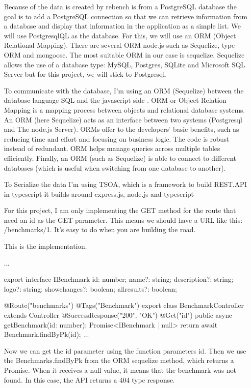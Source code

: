 \documentclass{article}
\begin{document}
Because of the data is created by rebench is from a PostgreSQL database the goal is to add a PostgreSQL connection so that we can retrieve information from a database and display that information in the application as a simple list.
We will use PostgresqlQL as the database. For this, we will use an ORM (Object Relational Mapping). There are several ORM node.js such as Sequelize, type ORM and mongoose. The most suitable ORM in our case is sequelize. Sequelize allows the use of a database type: MySQL, Postgres, SQLite and Microsoft SQL Server but for this project, we will stick to Postgresql.

To communicate with the database, I'm using an ORM (Sequelize) between the database language SQL and the javascript side \citep{pereira2016working}. ORM or Object Relation Mapping is a mapping process between objects and relational database systems. An ORM (here Sequelize) acts as an interface between two systems (Postgresql and The node.js Server). ORMs offer to the developers' basic benefits, such as reducing time and effort and focusing on business logic. The code is robust instead of redundant. ORM helps manage queries across multiple tables efficiently. Finally, an ORM (such as Sequelize) is able to connect to different databases (which is useful when switching from one database to another).



To Serialize the data I'm using TSOA, which is a framework to build REST.API in typescript it builds around express.js, node.js and typescript

For this project, I am only implementing the GET method for the route that need an id as the GET parameter. This means we should have a URL like this: /benchmarks/1. It's easy to do when you are building the road.

This is the implementation.

\begin{python}
...

export interface IBenchmark {
  id: number;
  name?: string;
  description?: string;
  logo?: string;
  showchanges?: boolean;
  allresults?: boolean;
}

@Route("benchmarks")
@Tags("Benchmark")
export class BenchmarkController extends Controller {
  @SuccessResponse("200", "OK")
  @Get("{id}")
  public async getBenchmark(id: number): Promise<IBenchmark | null> {
    return await Benchmark.findByPk(id);
  }
  ...
}
\end{python}

Now we can get the id parameter using the function parameters id. Then we use the Benchmarks.findByPk from the ORM sequelize method, which returns a Promise. When it receives a null value, it means that the benchmark was not found. In this case, the API returns a 404 type response.
\end{document}
